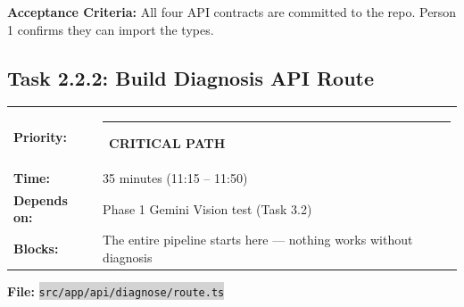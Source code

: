 \documentclass[11pt, a4paper]{article}
\newcommand{\critical}{\textcolor{critred}{\rule{6pt}{6pt}}~\textcolor{critred}{\scriptsize\textbf{CRITICAL PATH}}}
\newcommand{\code}[1]{\texttt{\small\colorbox{lightgray}{#1}}}
\begin{document}
\textbf{Acceptance Criteria:} All four API contracts are committed to the repo. Person 1 confirms they can import the types.

\vspace{1em}

\subsection{Task 2.2.2: Build Diagnosis API Route}

\begin{tabularx}{\textwidth}{lX}
\textbf{Priority:} & \critical \\
\textbf{Time:} & 35 minutes (11:15 -- 11:50) \\
\textbf{Depends on:} & Phase 1 Gemini Vision test (Task 3.2) \\
\textbf{Blocks:} & The entire pipeline starts here --- nothing works without diagnosis \\
\end{tabularx}

\vspace{0.3em}

\textbf{File:} \code{src/app/api/diagnose/route.ts}
\end{document}
